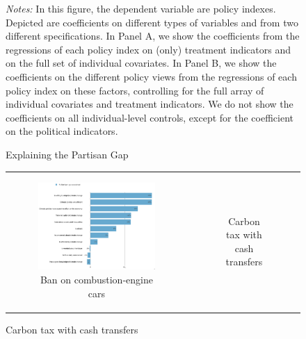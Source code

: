 \documentclass{article}
\begin{document}
\begin{figure}[h!]
{\footnotesize \textit{Notes:} In this figure, the dependent variable are policy indexes. Depicted are coefficients on different types of variables and from two different specifications. In Panel A, we show the coefficients from the regressions of each policy index on (only) treatment indicators and on the full set of individual covariates. In Panel B, we show the coefficients on the different policy views from the regressions of each policy index on these factors, controlling for the full array of individual covariates and treatment indicators. We do not show the coefficients on all individual-level controls, except for the coefficient on the political indicators.}
\end{figure}



\begin{figure}[h!]
\begin{center}
	\caption{Explaining the Partisan Gap}
	\caption*{Gelbach decomposition of the partisan gap in support for:}
	\setlength\extrarowheight{-1pt}
	\begin{tabular}{cc}
		\begin{subfigure}{0.5\textwidth}
		\caption{Ban on combustion-engine cars}
			\includegraphics[width=\textwidth]{gelbach_right_standard_D2SD}
		\end{subfigure}&
		\begin{subfigure}{0.5\textwidth}
		\caption{Carbon tax with cash transfers}

\end{subfigure}
\end{tabular}
\end{center}
\end{figure}
\end{document}
